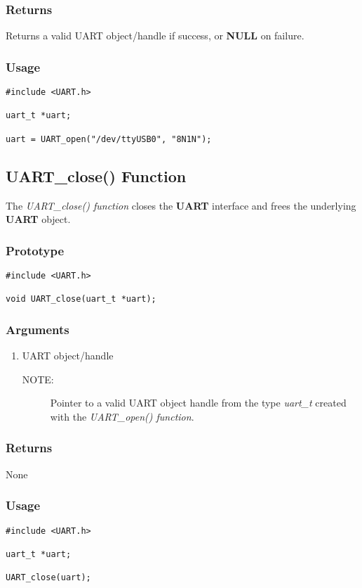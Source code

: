 \documentclass{report}
\begin{document}
\subsubsection*{Returns}
Returns a valid UART object/handle if success, or \textbf{NULL} on failure.
\subsubsection*{Usage}
\begin{lstlisting}
#include <UART.h>

uart_t *uart;

uart = UART_open("/dev/ttyUSB0", "8N1N");
\end{lstlisting}
\subsection{UART\_close() Function}
The \textit{UART\_close() function} closes the \textbf{UART} interface and
frees the underlying \textbf{UART} object.
\subsubsection*{Prototype}
\begin{lstlisting}
#include <UART.h>

void UART_close(uart_t *uart);
\end{lstlisting}
\subsubsection*{Arguments}
\begin{enumerate}
\item UART object/handle
\begin{description}
\item[NOTE:] Pointer to a valid UART object handle from the type \textit{uart\_t}
created with the \textit{UART\_open() function}.
\end{description}
\end{enumerate}
\subsubsection*{Returns}
None
\subsubsection*{Usage}
\begin{lstlisting}
#include <UART.h>

uart_t *uart;

UART_close(uart);
\end{lstlisting}
\end{document}
